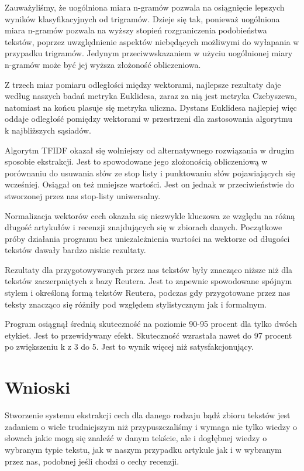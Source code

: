 \documentclass{classrep}
\begin{document}
	Zauważyliśmy, że uogólniona miara n-gramów pozwala na osiągnięcie lepszych wyników klasyfikacyjnych od trigramów. Dzieje się tak, ponieważ uogólniona miara n-gramów pozwala na wyższy stopień rozgraniczenia podobieństwa tekstów, poprzez uwzględnienie aspektów niebędących możliwymi do wyłapania w przypadku trigramów. Jedynym przeciwwskazaniem w użyciu uogólnionej miary n-gramów może być jej wyższa złożoność obliczeniowa.
	
	Z trzech miar pomiaru odległości między wektorami, najlepsze rezultaty daje według naszych badań metryka Euklidesa, zaraz za nią jest metryka Czebyszewa, natomiast na końcu plasuje się metryka uliczna. Dystans Euklidesa najlepiej więc oddaje odległość pomiędzy wektorami w przestrzeni dla zastosowania algorytmu k najbliższych sąsiadów.
	
	Algorytm TFIDF okazał się wolniejszy od alternatywnego rozwiązania w drugim sposobie ekstrakcji. Jest to spowodowane jego złożonością obliczeniową w porównaniu do usuwania słów ze stop listy i punktowaniu słów pojawiających się wcześniej. Osiągał on też mniejsze wartości. Jest on jednak w przeciwieństwie do stworzonej przez nas stop-listy uniwersalny.
	
	Normalizacja wektorów cech okazała się niezwykle kluczowa ze względu na różną długość artykułów i recenzji znajdujących się w zbiorach danych. Początkowe próby działania programu bez uniezależnienia wartości na wektorze od długości tekstów dawały bardzo niskie rezultaty.
	
	Rezultaty dla przygotowywanych przez nas tekstów były znacząco niższe niż dla tekstów zaczerpniętych z bazy Reutera. Jest to zapewnie spowodowane spójnym stylem i określoną formą tekstów Reutera, podczas gdy przygotowane przez nas teksty znacząco się różniły pod względem stylistycznym jak i formalnym.
	
	Program osiągnął średnią skuteczność na poziomie 90-95 procent dla tylko dwóch etykiet. Jest to przewidywany efekt. Skuteczność wzrastała nawet do 97 procent po zwiększeniu k z 3 do 5. Jest to wynik więcej niż satysfakcjonujący.

\section{Wnioski}
	Stworzenie systemu ekstrakcji cech dla danego rodzaju bądź zbioru tekstów jest zadaniem o wiele trudniejszym niż przypuszczaliśmy i wymaga nie tylko wiedzy o słowach jakie mogą się znaleźć w danym tekście, ale i dogłębnej wiedzy o wybranym typie tekstu, jak w naszym przypadku artykule jak i w wybranym przez nas, podobnej jeśli chodzi o cechy recenzji.
	
\end{document}
